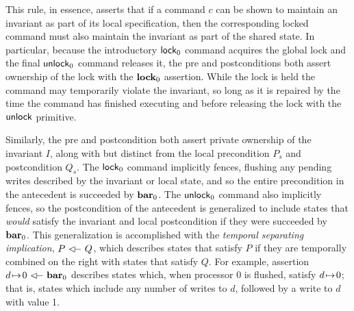 \documentclass[11pt]{report}
\begin{document}
This rule, in essence, asserts that if a command $c$ can be shown to maintain an invariant as part of its local specification, then the corresponding locked command must also maintain the invariant as part of the shared state. In particular, because the introductory $\operatorname{\mathsf{lock}}_0$ command acquires the global lock and the final $\operatorname{\mathsf{unlock}}_0$ command releases it, the pre and postconditions both assert ownership of the lock with the $\mathbf{lock}_{0}$ assertion. While the lock is held the command may temporarily violate the invariant, so long as it is repaired by the time the command has finished executing and before releasing the lock with the $\operatorname{\mathsf{unlock}}$ primitive. 

Similarly, the pre and postcondition both assert private ownership of the invariant $I$, along with but distinct from the local precondition $P_s$ and postcondition $Q_s$. The $\operatorname{\mathsf{lock}}_0$ command implicitly fences, flushing any pending writes described by the invariant or local state, and so the entire precondition in the antecedent is succeeded by $\mathbf{bar}_{0}$. The $\operatorname{\mathsf{unlock}}_0$ command also implicitly fences, so the postcondition of the antecedent is generalized to include states that \emph{would} satisfy the invariant and local postcondition if they were succeeded by $\mathbf{bar}_{0}$. This generalization is accomplished with the \emph{temporal separating implication}, $P \fseqri Q$, which describes states that satisfy $P$ if they are temporally combined on the right with states that satisfy $Q$. For example, assertion $d \fpointsto 0 \fseqri \fbar{0}$ describes states which, when processor 0 is flushed, satisfy $d \!\mapsto\! 0$; that is, states which include any number of writes to $d$, followed by a write to $d$ with value 1. 
\end{document}
